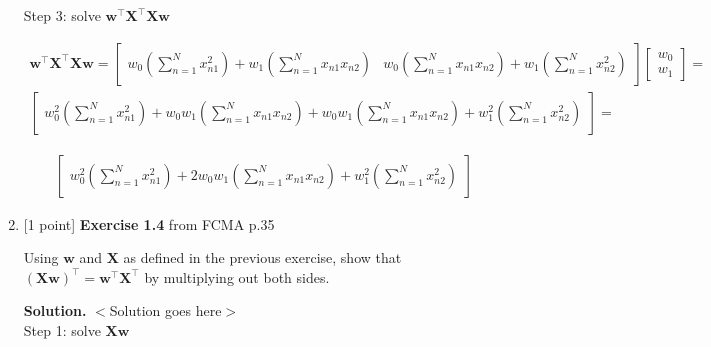 \documentclass[10pt]{article}
\begin{document}
\begin{enumerate}
Step 3: solve $\mathbf{w}^\top\mathbf{X}^\top\mathbf{X}\mathbf{w}$

\begin{eqnarray*}
\mathbf{w}^\top\mathbf{X}^\top\mathbf{X}\mathbf{w} = 
	\begin{bmatrix}
	w_0 \left( \sum_{n=1}^N x_{n1}^2 \right) + w_1 \left( 		\sum_{n=1}^N x_{n1}x_{n2} \right) & w_0 \left( \sum_{n=1}^N x_{n1}x_{n2} \right) + w_1 \left( \sum_{n=1}^N x_{n2}^2 \right)
	\end{bmatrix}
    \begin{bmatrix}
    w_0 \\[0.3em]
    w_1
    \end{bmatrix} = 
\end{eqnarray*}
\begin{eqnarray*}
    \begin{bmatrix}
	w_0^2 \left( \sum_{n=1}^N x_{n1}^2 \right) + w_0w_1 \left( 		\sum_{n=1}^N x_{n1}x_{n2} \right) + w_0w_1 \left( \sum_{n=1}^N x_{n1}x_{n2} \right) + w_1^2 \left( \sum_{n=1}^N x_{n2}^2 \right)
    \end{bmatrix} =
\end{eqnarray*}

\begin{eqnarray*}
\begin{bmatrix}
	w_0^2 \left( \sum_{n=1}^N x_{n1}^2 \right) + 2w_0w_1 \left( 		\sum_{n=1}^N x_{n1}x_{n2} \right) + w_1^2 \left( \sum_{n=1}^N x_{n2}^2 \right)
    \end{bmatrix}
\end{eqnarray*}


\item \label{prob:4} [1 point]
{\bf Exercise 1.4} from FCMA p.35

Using $\mathbf{w}$ and $\mathbf{X}$ as defined in the previous exercise, show that ${(\mathbf{X}\mathbf{w})}^\top = {\mathbf{w}}^\top{\mathbf{X}}^\top$ by multiplying out both sides.

{\bf Solution.} $<$Solution goes here$>$\\

Step 1: solve $\mathbf{X}\mathbf{w}$



\end{enumerate}
\end{document}
